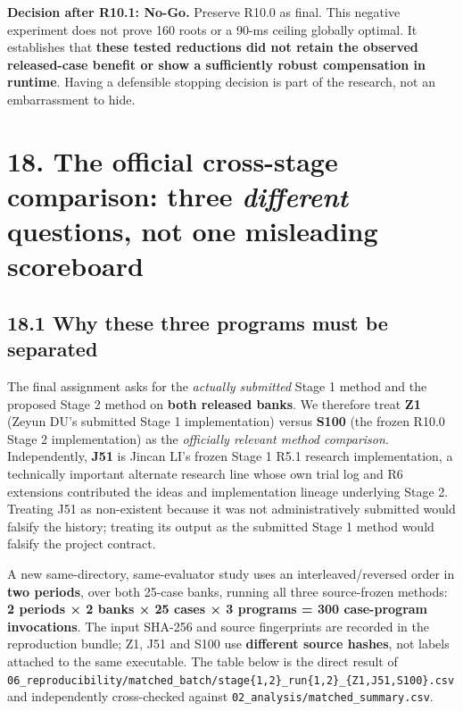 \textbf{Decision after R10.1: No-Go.} Preserve R10.0 as final. This negative experiment does not prove 160 roots or a 90-ms ceiling globally optimal. It establishes that \textbf{these tested reductions did not retain the observed released-case benefit or show a sufficiently robust compensation in runtime}. Having a defensible stopping decision is part of the research, not an embarrassment to hide.

\section{\texorpdfstring{18. The official cross-stage comparison: three \emph{different} questions, not one misleading scoreboard}{18. The official cross-stage comparison: three different questions, not one misleading scoreboard}}\label{the-official-cross-stage-comparison-three-different-questions-not-one-misleading-scoreboard}

\subsection{18.1 Why these three programs must be separated}\label{why-these-three-programs-must-be-separated}

The final assignment asks for the \emph{actually submitted} Stage 1 method and the proposed Stage 2 method on \textbf{both released banks}. We therefore treat \textbf{Z1} (Zeyun DU's submitted Stage 1 implementation) versus \textbf{S100} (the frozen R10.0 Stage 2 implementation) as the \emph{officially relevant method comparison}. Independently, \textbf{J51} is Jincan LI's frozen Stage 1 R5.1 research implementation, a technically important alternate research line whose own trial log and R6 extensions contributed the ideas and implementation lineage underlying Stage 2. Treating J51 as non-existent because it was not administratively submitted would falsify the history; treating its output as the submitted Stage 1 method would falsify the project contract.

A new same-directory, same-evaluator study uses an interleaved/reversed order in \textbf{two periods}, over both 25-case banks, running all three source-frozen methods: \textbf{2 periods × 2 banks × 25 cases × 3 programs = 300 case-program invocations}. The input SHA-256 and source fingerprints are recorded in the reproduction bundle; Z1, J51 and S100 use \textbf{different source hashes}, not labels attached to the same executable. The table below is the direct result of \texttt{06\_reproducibility/matched\_batch/stage\{1,2\}\_run\{1,2\}\_\{Z1,J51,S100\}.csv} and independently cross-checked against \texttt{02\_analysis/matched\_summary.csv}.

